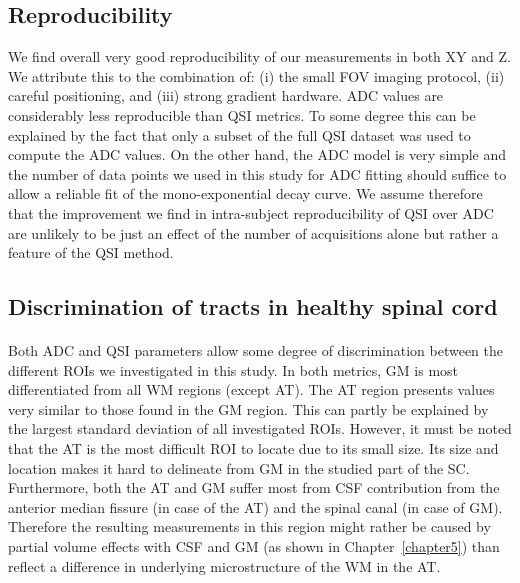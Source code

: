 \subsection{Reproducibility}
 We find overall very good reproducibility of our measurements in both XY and Z. We attribute this to the combination of: (i) the small FOV imaging protocol, (ii) careful positioning, and (iii) strong gradient hardware. ADC values are considerably less reproducible than QSI metrics. To some degree this can be explained by the fact that only a subset of the full QSI dataset was used to compute the ADC values. On the other hand, the ADC model is very simple and the number of data points we used in this study for ADC fitting should suffice to allow a reliable fit of the mono-exponential decay curve. We assume therefore that the improvement we find in intra-subject reproducibility of QSI over ADC are unlikely to be just an effect of the number of acquisitions alone but rather a feature of the QSI method.

\subsection{Discrimination of tracts in healthy spinal cord}
\paragraph{} Both ADC and QSI parameters allow some degree of discrimination between the different \glspl{ROI} we investigated in this study. In both metrics, GM is most differentiated from all WM regions (except AT). The AT region presents values very similar to those found in the GM region. This can partly be explained by the largest standard deviation of all investigated \glspl{ROI}. However, it must be noted that the AT is the most difficult \gls{ROI} to locate due to its small size. Its size and location makes it hard to delineate from GM in the studied part of the \gls{SC}. Furthermore, both the AT and GM suffer most from \gls{CSF} contribution from the anterior median fissure (in case of the AT) and the spinal canal (in case of GM). Therefore the resulting measurements in this region might rather be caused by partial volume effects with \gls{CSF} and GM (as shown in Chapter~\ref{chapter5}) than reflect a difference in underlying microstructure of the WM in the AT.

